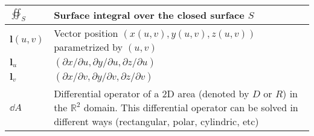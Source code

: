 \documentclass{article}
\begin{document}
\begin{xltabular}{\textwidth}{XX}
	\(\oiint_S\)                                                                                                                                                                                                                               & Surface integral over the closed surface \(S\)                                                                                                                                                                                                          \\ \hline
	\(\mathbf{l}(u,v)\)                                                                                                                                                                                                                        & Vector position \((x(u,v), y(u,v), z(u,v))\) parametrized by \((u,v)\)                                                                                                                                                                                  \\ \hline
	\(\mathbf{l}_u\)                                                                                                                                                                                                                           & \((\partial x/ \partial u, \partial y/ \partial u, \partial z/ \partial u)\)                                                                                                                                                                            \\ \hline
	\(\mathbf{l}_v\)                                                                                                                                                                                                                           & \((\partial x/ \partial v, \partial y/ \partial v, \partial z/ \partial v)\)                                                                                                                                                                            \\ \hline
	\(\dd{A}\)                                                                                                                                                                                                                                 & Differential operator of a 2D area (denoted by \(D\) or \(R\)) in the \(\mathbb{R}^2\) domain. This differential operator can be solved in different ways (rectangular, polar, cylindric, etc) \cite{stewartCalculus2011}                               \\ \hline

\end{xltabular}
\end{document}
